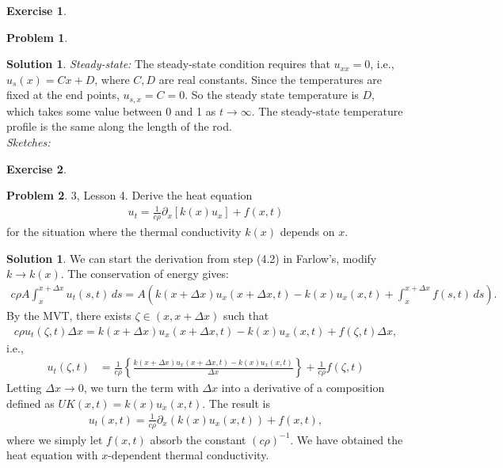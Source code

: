 \documentclass{article}
\theoremstyle{definition}
\newtheorem{sln}{Solution}[section]
\newtheorem*{prob*}{Problem}
\newtheorem*{exer*}{Exercise}
\newtheorem*{sln*}{Solution}
\newcommand{\p}{\partial}
\begin{document}
\begin{exer*}
\begin{prob*}
\begin{sln}
			\textit{Steady-state:} The steady-state condition requires that $u_{xx} = 0$, i.e., $u_s(x) = Cx + D$, where $C,D$ are real constants. Since the temperatures are fixed at the end points, $u_{s,x} = C = 0$. So the steady state temperature is $D$, which takes some value between 0 and 1 as $t\to \infty$. The steady-state temperature profile is the same along the length of the rod. \\
			
			\textit{Sketches:}
		\end{sln}
	\end{prob*}
\end{exer*}

\newpage


\begin{exer*}
	\begin{prob*}3, Lesson 4. Derive the heat equation
		\begin{align*}
		u_t = \frac{1}{c\rho}\p_x[k(x)u_x] + f(x,t)
		\end{align*}
		for the situation where the thermal conductivity $k(x)$ depends on $x$.\\
		\begin{sln*}
			We can start the derivation from step (4.2) in Farlow's, modify $k \to k(x)$. The conservation of energy gives:
			\begin{align*}
			c\rho A\int_{x}^{x+\Delta x}u_t(s,t)\,ds = A\left(k(x+\Delta x)u_x(x+\Delta x,t) - k(x)u_x(x,t)  + \int_x^{x+\Delta x}f(s,t)\,ds \right).
			\end{align*}
			By the MVT, there exists $\zeta \in (x,x+\Delta x)$ such that
			\begin{align*}
			c\rho u_t(\zeta, t)\Delta x = k(x+\Delta x)u_x(x+\Delta x,t) - k(x)u_x(x,t) + f(\zeta,t)\Delta x,
			\end{align*} 
			i.e.,
			\begin{align*}
			u_t(\zeta,t) &= \frac{1}{c\rho}\left\{ \frac{k(x+\Delta x)u_x(x+\Delta x,t) - k(x)u_x(x,t)}{\Delta x} \right\} + \frac{1}{c\rho}f(\zeta,t)
			\end{align*}
			Letting $\Delta x \to 0$, we turn the term with $\Delta x$ into a derivative of a composition defined as $UK(x,t) = k(x)u_x(x,t)$. The result is
			\begin{align*}
			u_t(x,t) = \frac{1}{c\rho}\p_x(k(x)u_x(x,t)) + f(x,t),
			\end{align*}
			where we simply let $f(x,t)$ absorb the constant $(c\rho)^{-1}$. We have obtained the heat equation with $x$-dependent thermal conductivity. 
		\end{sln*}
	\end{prob*}
\end{exer*}
\end{document}
